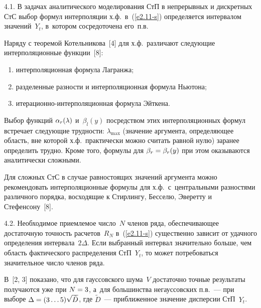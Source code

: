 \begin{multicols}{2}
\vspace*{-2pt}


4.1. В задачах аналитического моделирования СтП в непрерывных и дискретных 
СтС выбор формул интерполяции х.ф.\ в~(\ref{e2.11-s}) 
определяется интервалом значений~$Y_t$, в~котором сосредоточена его~п.в.

Наряду с теоремой Котельникова~[4] для х.ф.\ 
различают следующие интерполяционные функции~[8]:
\begin{enumerate}[(1)]
\item интерполяционная формула Лагранжа;

\item разделенные разности и интерполяционная формула Ньютона;

\item итерационно-ин\-тер\-по\-ля\-ци\-он\-ная формула Эйткена.
\end{enumerate}

Выбор функций  $\alpha_r (\lambda)$  и~$\beta_l (y)$ посредством этих
интерполяционных формул встречает сле\-ду\-ющие
 трудности: $\lambda_{\max}$ 
(значение аргумента, опре\-де\-ля\-ющее об\-ласть, вне которой х.ф.\
 практически мож\-но
 считать рав\-ной нулю) заранее определить труд\-но.
  Кроме того, формулы для $\beta_r\hm=\beta_r(y)$ при этом оказываются 
 аналитически сложными. %

\pagebreak

 

Для сложных СтС в случае равностоящих значений аргумента можно 
рекомендовать интерполяционные формулы для х.ф.\
 с~центральными разностями различного порядка, восходящие к Стирлингу, Бесселю, 
 Эверетту и Стефенсону~[8].

4.2. Необходимое приемлемое число~$N$ членов ряда, обеспечивающее 
достаточную точность расчетов~$R_N$ в~(\ref{e2.11-s}) существенно зависит от 
удачного определения интервала~$2\Delta$. Если выбранный 
интервал значительно больше, чем область фактического распределения СтП~$Y_t$, 
то может потребоваться значительное число членов ряда.

В~[2, 3] показано, что для гауссовского шума~$V$ достаточно точные 
результаты получаются уже при $N\hm=3$, а~для большинства негауссовских п.в.~--- 
при выборе $\Delta\hm= (3\ldots5) \sqrt{\tilde D}$, где $\tilde D$~--- 
приближенное значение дисперсии СтП~$Y_t$.


\end{multicols}
